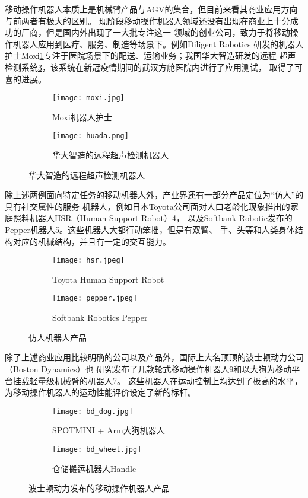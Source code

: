 移动操作机器人本质上是机械臂产品与AGV的集合，但目前来看其商业应用方向与前两者有极大的区别。
现阶段移动操作机器人领域还没有出现在商业上十分成功的厂商，但是国内外出现了一大批专注这一
领域的创业公司，致力于将移动操作机器人应用到医疗、服务、制造等场景下。例如Diligent Robotics
研发的机器人护士Moxi\ref{fig:moxi}专注于医院场景下的配送、运输业务；我国华大智造研发的远程
超声检测系统\ref{fig:huada}，该系统在新冠疫情期间的武汉方舱医院内进行了应用测试\cite{wushengzheng20205g}，
取得了可喜的进展。

\begin{figure}
\centering
\begin{subfigure}{.5\textwidth}
  \centering
  \texttt{[image: moxi.jpg]}
  \caption{Moxi机器人护士}
  \label{fig:moxi}
\end{subfigure}%
\begin{subfigure}{.5\textwidth}
  \centering
  \texttt{[image: huada.png]}
  \caption{华大智造的远程超声检测机器人}
  \label{fig:huada}
\end{subfigure}%
\end{figure}

除上述两例面向特定任务的移动机器人外，产业界还有一部分产品定位为“仿人”的具有社交属性的服务
机器人，例如日本Toyota公司面对人口老龄化现象推出的家庭照料机器人HSR（Human Support Robot）\ref{fig:hsr}，
以及Softbank Robotic发布的Pepper机器人\ref{fig:pepper}。这些机器人大都行动笨拙，但是有双臂、
手、头等和人类身体结构对应的机械结构，并且有一定的交互能力。

\begin{figure}
\centering
\begin{subfigure}{.5\textwidth}
  \centering
  \texttt{[image: hsr.jpeg]}
  \caption{Toyota Human Support Robot}
  \label{fig:hsr}
\end{subfigure}%
\begin{subfigure}{.5\textwidth}
  \centering
  \texttt{[image: pepper.jpeg]}
  \caption{Softbank Robotics Pepper}
  \label{fig:pepper}
\end{subfigure}
\label{fig:hsr_pepper}
\caption{仿人机器人产品}
\end{figure}

除了上述商业应用比较明确的公司以及产品外，国际上大名顶顶的波士顿动力公司（Boston Dynamics）也
研究发布了几款轮式移动操作机器人\ref{fig:bd_wheel}和以大狗为移动平台挂载轻量级机械臂的机器人\ref{fig:bd_dog}。
这些机器人在运动控制上均达到了极高的水平，为移动操作机器人的运动性能评价设定了新的标杆。

\begin{figure}
\centering
\begin{subfigure}{.5\textwidth}
  \centering
  \texttt{[image: bd\_dog.jpg]}
  \caption{SPOTMINI + Arm大狗机器人}
  \label{fig:bd_dog}
\end{subfigure}%
\begin{subfigure}{.5\textwidth}
  \centering
  \texttt{[image: bd\_wheel.jpg]}
  \caption{仓储搬运机器人Handle}
  \label{fig:bd_wheel}
\end{subfigure}
\caption{波士顿动力发布的移动操作机器人产品}
\end{figure}


